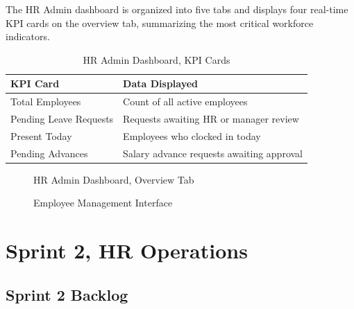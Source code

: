 \documentclass[12pt,a4paper]{report}
\begin{document}
The HR Admin dashboard is organized into five tabs and displays four real-time KPI cards
on the overview tab, summarizing the most critical workforce indicators.

\begin{table}[H]
\centering
\caption{HR Admin Dashboard, KPI Cards}
\label{tab:kpi_cards}
\begin{tabular}{|C{4cm}|L{9cm}|}
\hline
{}
\textbf{KPI Card} & \textbf{Data Displayed} \\
\hline
Total Employees       & Count of all active employees \\
\hline
Pending Leave Requests & Requests awaiting HR or manager review \\
\hline
Present Today         & Employees who clocked in today \\
\hline
Pending Advances      & Salary advance requests awaiting approval \\
\hline
\end{tabular}
\end{table}

\begin{figure}[H]
\centering
{}
\caption{HR Admin Dashboard, Overview Tab}
\label{fig:hr_dashboard}
\end{figure}

\begin{figure}[H]
\centering
{}
\caption{Employee Management Interface}
\label{fig:employees}
\end{figure}

\section{Sprint 2, HR Operations}

\subsection{Sprint 2 Backlog}
\end{document}
